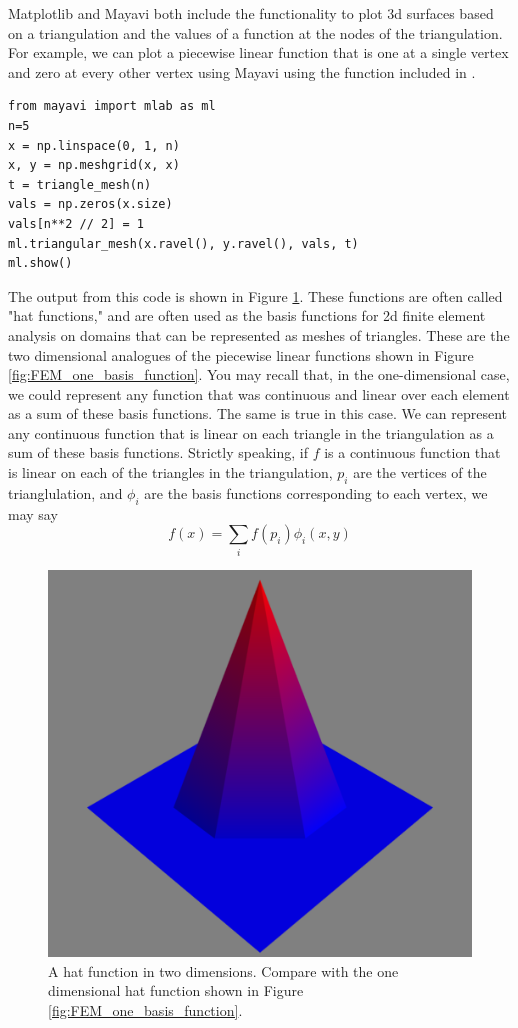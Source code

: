 Matplotlib and Mayavi both include the functionality to plot 3d surfaces based on a triangulation and the values of a function at the nodes of the triangulation.
For example, we can plot a piecewise linear function that is one at a single vertex and zero at every other vertex using Mayavi using the  function included in .
\begin{lstlisting}
from mayavi import mlab as ml
n=5
x = np.linspace(0, 1, n)
x, y = np.meshgrid(x, x)
t = triangle_mesh(n)
vals = np.zeros(x.size)
vals[n**2 // 2] = 1
ml.triangular_mesh(x.ravel(), y.ravel(), vals, t)
ml.show()
\end{lstlisting}
The output from this code is shown in Figure \ref{fig:fem2d_basis_functions}.
These functions are often called "hat functions," and are often used as the basis functions for 2d finite element analysis on domains that can be represented as meshes of triangles.
These are the two dimensional analogues of the piecewise linear functions shown in Figure \ref{fig:FEM_one_basis_function}.
You may recall that, in the one-dimensional case, we could represent any function that was continuous and linear over each element as a sum of these basis functions.
The same is true in this case.
We can represent any continuous function that is linear on each triangle in the triangulation as a sum of these basis functions.
Strictly speaking, if $f$ is a continuous function that is linear on each of the triangles in the triangulation, $p_i$ are the vertices of the trianglulation, and $\phi_i$ are the basis functions corresponding to each vertex, we may say
\[f(x) = \sum_{i} f(p_i) \phi_i(x, y)\]

\begin{figure}
\includegraphics[width=\textwidth]{hat_function.png}
\caption{A hat function in two dimensions. Compare with the one dimensional hat function shown in Figure \ref{fig:FEM_one_basis_function}.}
\label{fig:fem2d_basis_functions}
\end{figure}


